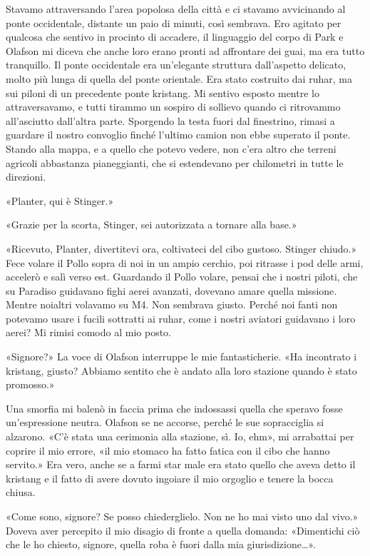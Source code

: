 Stavamo attraversando l'area popolosa della città e ci stavamo
avvicinando al ponte occidentale, distante un paio di minuti, così
sembrava. Ero agitato per qualcosa che sentivo in procinto di accadere,
il linguaggio del corpo di Park e Olafson mi diceva che anche loro erano
pronti ad affrontare dei guai, ma era tutto tranquillo. Il ponte
occidentale era un'elegante struttura dall'aspetto delicato, molto più
lunga di quella del ponte orientale. Era stato costruito dai ruhar, ma
sui piloni di un precedente ponte kristang. Mi sentivo esposto mentre lo
attraversavamo, e tutti tirammo un sospiro di sollievo quando ci
ritrovammo all'asciutto dall'altra parte. Sporgendo la testa fuori dal
finestrino, rimasi a guardare il nostro convoglio finché l'ultimo camion
non ebbe superato il ponte. Stando alla mappa, e a quello che potevo
vedere, non c'era altro che terreni agricoli abbastanza pianeggianti,
che si estendevano per chilometri in tutte le direzioni.

«Planter, qui è Stinger.»

«Grazie per la scorta, Stinger, sei autorizzata a tornare alla base.»

«Ricevuto, Planter, divertitevi ora, coltivateci del cibo gustoso.
Stinger chiudo.» Fece volare il Pollo sopra di noi in un ampio cerchio,
poi ritrasse i pod delle armi, accelerò e salì verso est. Guardando il
Pollo volare, pensai che i nostri piloti, che su Paradiso guidavano
fighi aerei avanzati, dovevano amare quella missione. Mentre noialtri
volavamo su M4. Non sembrava giusto. Perché noi fanti non potevamo usare
i fucili sottratti ai ruhar, come i nostri aviatori guidavano i loro
aerei? Mi rimisi comodo al mio posto.

«Signore?» La voce di Olafson interruppe le mie fantasticherie. «Ha
incontrato i kristang, giusto? Abbiamo sentito che è andato alla loro
stazione quando è stato promosso.»

Una smorfia mi balenò in faccia prima che indossassi quella che speravo
fosse un'espressione neutra. Olafson se ne accorse, perché le sue
sopracciglia si alzarono. «C'è stata una cerimonia alla stazione, sì.
Io, ehm», mi arrabattai per coprire il mio errore, «il mio stomaco ha
fatto fatica con il cibo che hanno servito.» Era vero, anche se a farmi
star male era stato quello che aveva detto il kristang e il fatto di
avere dovuto ingoiare il mio orgoglio e tenere la bocca chiusa.

«Come sono, signore? Se posso chiederglielo. Non ne ho mai visto uno dal
vivo.» Doveva aver percepito il mio disagio di fronte a quella domanda:
«Dimentichi ciò che le ho chiesto, signore, quella roba è fuori dalla
mia giurisdizione\ldots».

